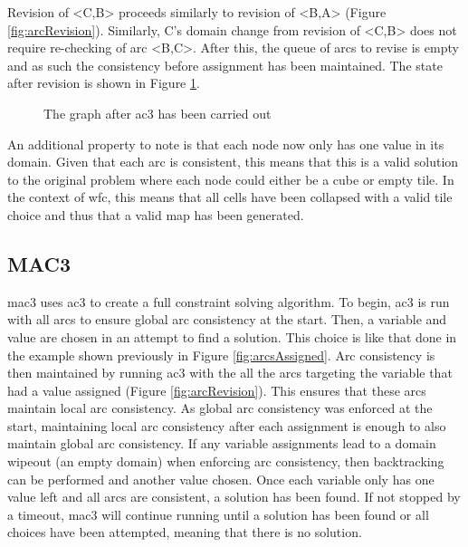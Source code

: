 Revision of <C,B> proceeds similarly to revision of <B,A> (Figure \ref{fig:arcRevision}). Similarly, C's domain change from revision of <C,B> does not require re-checking of arc <B,C>. After this, the queue of arcs to revise is empty and as such the consistency before assignment has been maintained. The state after revision is shown in Figure \ref{fig:arcsRevised2}.

\begin{figure}[H]
    \centering

    \caption{The graph after \acrshort{ac3} has been carried out}
    \label{fig:arcsRevised2}
\end{figure}

An additional property to note is that each node now only has one value in its domain. Given that each arc is consistent, this means that this is a valid solution to the original problem where each node could either be a cube or empty tile. In the context of \acrshort{wfc}, this means that all cells have been collapsed with a valid tile choice and thus that a valid map has been generated.

\subsection{MAC3}
\acrfull{mac3} uses \acrfull{ac3} to create a full constraint solving algorithm. To begin, \acrshort{ac3} is run with all arcs to ensure global arc consistency at the start. Then, a variable and value are chosen in an attempt to find a solution. This choice is like that done in the example shown previously in Figure \ref{fig:arcsAssigned}. Arc consistency is then maintained by running \acrshort{ac3} with the all the arcs targeting the variable that had a value assigned (Figure \ref{fig:arcRevision}). This ensures that these arcs maintain local arc consistency. As global arc consistency was enforced at the start, maintaining local arc consistency after each assignment is enough to also maintain global arc consistency. If any variable assignments lead to a domain wipeout (an empty domain) when enforcing arc consistency, then backtracking can be performed and another value chosen. Once each variable only has one value left and all arcs are consistent, a solution has been found. If not stopped by a timeout, \acrshort{mac3} will continue running until a solution has been found or all choices have been attempted, meaning that there is no solution.

